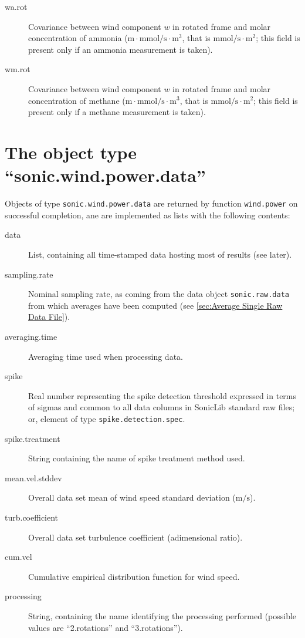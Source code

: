 \documentclass[a4paper,10pt]{book}
\begin{document}
\begin{description}
 \item[wa.rot] Covariance between wind component $w$ in rotated frame and molar concentration of ammonia ($\mbox{m}\cdot\mbox{mmol}/\mbox{s}\cdot\mbox{m}^3$, that is $\mbox{mmol}/\mbox{s}\cdot\mbox{m}^2$; this field is present only if an ammonia measurement is taken).
 \item[wm.rot] Covariance between wind component $w$ in rotated frame and molar concentration of methane ($\mbox{m}\cdot\mbox{mmol}/\mbox{s}\cdot\mbox{m}^3$, that is $\mbox{mmol}/\mbox{s}\cdot\mbox{m}^2$; this field is present only if a methane measurement is taken).
\end{description}

\section{The object type ``sonic.wind.power.data''}
\label{sec:sonic.wind.power.data}

Objects of type \verb|sonic.wind.power.data| are returned by function \verb|wind.power| on successful completion, ane are implemented as lists with the following contents:

\begin{description}
 \item[data] List, containing all time-stamped data hosting most of results (see later).
 \item[sampling.rate] Nominal sampling rate, as coming from the data object \verb|sonic.raw.data| from which averages have been computed (see \ref{sec:Average Single Raw Data File}).
 \item[averaging.time] Averaging time used when processing data.
 \item[spike] Real number representing the spike detection threshold expressed in terms of sigmas and common to all data columns in SonicLib standard raw files; or, element of type \verb|spike.detection.spec|.
 \item[spike.treatment] String containing the name of spike treatment method used.
 \item[mean.vel.stddev] Overall data set mean of wind speed standard deviation ($\mbox{m/s}$).
 \item[turb.coefficient] Overall data set turbulence coefficient (adimensional ratio).
 \item[cum.vel] Cumulative empirical distribution function for wind speed.
 \item[processing] String, containing the name identifying the processing performed (possible values are ``2.rotations'' and ``3.rotations'').
\end{description}
\end{document}
